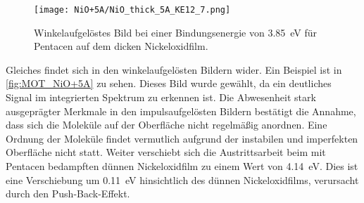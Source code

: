             \begin{figure}
                \centering
                \texttt{[image: NiO+5A/NiO\_thick\_5A\_KE12\_7.png]}
                \caption{Winkelaufgelöstes Bild bei einer Bindungsenergie von \SI{3.85}{\electronvolt} für Pentacen auf dem dicken Nickeloxidfilm.} %
                \label{fig:MOT_NiO+5A}
            \end{figure}
            Gleiches findet sich in den winkelaufgelösten Bildern wider.
            Ein Beispiel ist in \autoref{fig:MOT_NiO+5A} zu sehen.
            Dieses Bild wurde gewählt, da ein deutliches Signal im integrierten Spektrum zu erkennen ist.
            Die Abwesenheit stark ausgeprägter Merkmale in den impulsaufgelösten Bildern bestätigt die Annahme, dass sich die Moleküle auf der Oberfläche nicht regelmäßig anordnen.
            Eine Ordnung der Moleküle findet vermutlich aufgrund der instabilen und imperfekten Oberfläche nicht statt.
            Weiter verschiebt sich die Austrittsarbeit beim mit Pentacen bedampften dünnen Nickeloxidfilm zu einem Wert von \SI{4.14}{\electronvolt}.
            Dies ist eine Verschiebung um \SI{0.11}{\electronvolt} hinsichtlich des dünnen Nickeloxidfilms, verursacht durch den Push-Back-Effekt.

